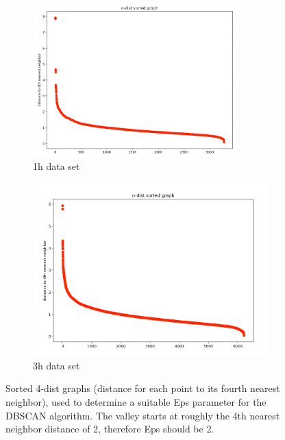 \begin{figure}[H]
  \centering
  \begin{subfigure}{.5\textwidth}
    \centering
    \includegraphics[width=0.87\textwidth]{./images/kDistGraphDBSCAN1h.png}
  \caption{1h data set}
  \label{figure:kDistGraphDBSCAN1h}
  \end{subfigure}%
  \begin{subfigure}{.5\textwidth}
    \centering
    \includegraphics[width=1\textwidth]{./images/kDistGraphDBSCAN3h.png}
    \caption{3h data set}
    \label{figure:kDistGraphDBSCAN3h}
  \end{subfigure}
  \caption{Sorted 4-dist graphs (distance for each point to its fourth nearest neighbor), used to determine a suitable Eps parameter for the DBSCAN algorithm. The valley starts at roughly the 4th nearest neighbor distance of 2, therefore Eps should be 2.}
  \label{figure:kDistGraphDBSCAN}
  \end{figure}

